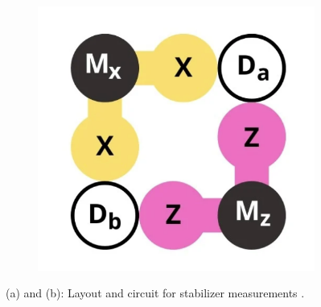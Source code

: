 \documentclass[9pt,a4paper,twocolumn,twoside]{tau-class/tau}
\begin{document}
\vspace{-\baselineskip}
\begin{figure}[ht]
\begin{subfigure}[b]{0.17\textwidth}
    \includegraphics[scale=0.3]{figures/4 qubits.jpeg}
\end{subfigure}
\caption{(a) and (b): Layout and circuit for stabilizer measurements \cite{fowler2012surface}.}
\label{fig:combined}
\end{figure}
\end{document}
